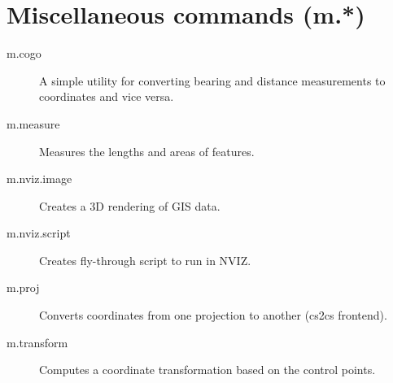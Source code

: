 
\section{Miscellaneous commands (m.{*})}
\begin{description}
\item [{m.cogo}] A simple utility for converting bearing and distance measurements
to coordinates and vice versa.
\item [{m.measure}] Measures the lengths and areas of features.
\item [{m.nviz.image}] Creates a 3D rendering of GIS data.
\item [{m.nviz.script}] Creates fly-through script to run in NVIZ.
\item [{m.proj}] Converts coordinates from one projection to another (cs2cs
frontend).
\item [{m.transform}] Computes a coordinate transformation based on the
control points.\end{description}

